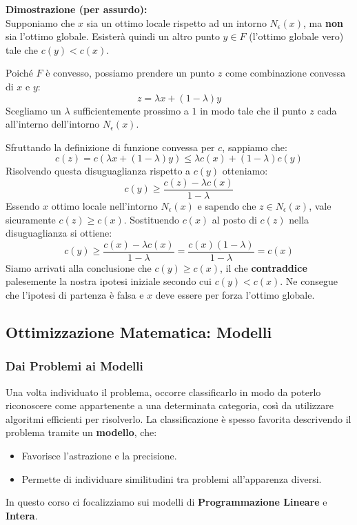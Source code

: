 \documentclass[12pt]{extarticle} %
\begin{document}
\noindent\textbf{Dimostrazione (per assurdo):}\\
Supponiamo che $x$ sia un ottimo locale rispetto ad un intorno $N_\epsilon(x)$, ma \textbf{non} sia l'ottimo globale. Esisterà quindi un altro punto $y \in F$ (l'ottimo globale vero) tale che $c(y) < c(x)$.

Poiché $F$ è convesso, possiamo prendere un punto $z$ come combinazione convessa di $x$ e $y$: 
$$z = \lambda x + (1-\lambda)y$$
Scegliamo un $\lambda$ sufficientemente prossimo a $1$ in modo tale che il punto $z$ cada all'interno dell'intorno $N_\epsilon(x)$.

Sfruttando la definizione di funzione convessa per $c$, sappiamo che:
$$ c(z) = c(\lambda x + (1-\lambda)y) \le \lambda c(x) + (1-\lambda)c(y) $$
Risolvendo questa disuguaglianza rispetto a $c(y)$ otteniamo:
$$ c(y) \ge \frac{c(z) - \lambda c(x)}{1-\lambda} $$
Essendo $x$ ottimo locale nell'intorno $N_\epsilon(x)$ e sapendo che $z \in N_\epsilon(x)$, vale sicuramente $c(z) \ge c(x)$. Sostituendo $c(x)$ al posto di $c(z)$ nella disuguaglianza si ottiene:
$$ c(y) \ge \frac{c(x) - \lambda c(x)}{1-\lambda} = \frac{c(x)(1-\lambda)}{1-\lambda} = c(x) $$
Siamo arrivati alla conclusione che $c(y) \ge c(x)$, il che \textbf{contraddice} palesemente la nostra ipotesi iniziale secondo cui $c(y) < c(x)$. 
Ne consegue che l'ipotesi di partenza è falsa e $x$ deve essere per forza l'ottimo globale.

\newpage

\subsection{Ottimizzazione Matematica: Modelli}

\subsubsection{Dai Problemi ai Modelli}
Una volta individuato il problema, occorre classificarlo in modo da poterlo riconoscere come appartenente a una determinata categoria, così da utilizzare algoritmi efficienti per risolverlo. La classificazione è spesso favorita descrivendo il problema tramite un \textbf{modello}, che:
\begin{itemize}
    \item Favorisce l'astrazione e la precisione.
    \item Permette di individuare similitudini tra problemi all'apparenza diversi.
\end{itemize}
In questo corso ci focalizziamo sui modelli di \textbf{Programmazione Lineare} e \textbf{Intera}.
\end{document}
